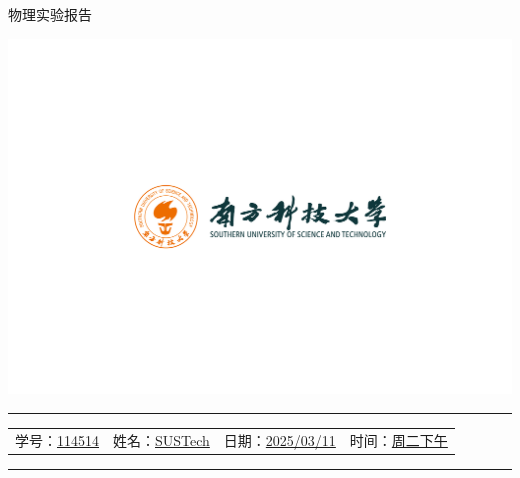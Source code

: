 \documentclass[12pt,a4paper]{article}
\begin{document}
	\noindent
	\hspace{-2em}
	\begin{minipage}[c]{0.65\textwidth}
		\raggedright
		{\fontsize{40pt}{60pt}\selectfont 物理实验报告}
	\end{minipage}
	\begin{minipage}[c]{0.35\textwidth}
		\raggedleft
		\includegraphics[width=\linewidth, trim={20cm 20cm 20cm 20cm}, clip]{university_logo.png}
	\end{minipage}

	\vspace{-1em}
	

	
	\hrule
	\vspace{0.4em}
	\noindent
	\begin{tabular}{l l l l}
    学号：\underline{114514} & 姓名：\underline{SUSTech} &
    日期：\underline{2025/03/11} & 时间：\underline{周二下午}
	\end{tabular}
	\vspace{-0em}
	\par
	\hrule

	

\end{document}
